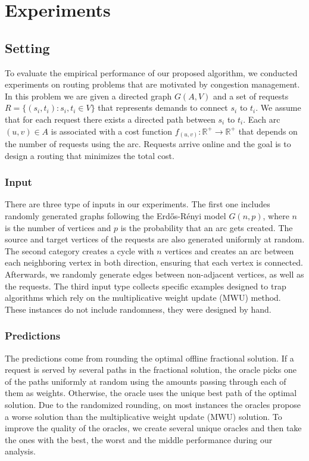 
\section{Experiments} \label{sec:exp}

\subsection{Setting}
To evaluate the empirical performance of our proposed algorithm, we conducted experiments on routing problems
that are motivated by congestion management.
In this problem we are given a directed graph $G(A,V)$ and a set of requests $R = \{(s_{i}, t_{i}) : s_{i}, t_{i} \in V\}$ that represents demands to connect $s_{i}$ to $t_{i}$. We assume that for each request there exists a directed path between $s_{i}$ to $t_{i}$.
Each arc $(u, v) \in A$ is associated with a cost function $f_{(u,v)}: \mathbb{R}^{+} \rightarrow \mathbb{R}^{+}$ that depends on the number of requests using the arc.
Requests arrive online and the goal is to design a routing that minimizes the total cost.


\subsubsection{Input}
There are three type of inputs in our experiments. The first one includes randomly generated graphs following the Erd\H{o}s-Rényi model $G(n, p)$, where $n$ is the number of vertices and $p$ is the probability that an arc gets created. The source and target vertices of the requests are also generated uniformly at random. The second category creates a cycle with $n$ vertices and creates an arc between each neighboring vertex in both direction, ensuring that each vertex is connected. Afterwards, we randomly generate edges between non-adjacent vertices, as well as the requests.
The third input type collects specific examples designed to trap algorithms which rely on the multiplicative weight update (MWU) method. These instances do not include randomness, they were designed by hand.


\subsubsection{Predictions}
The predictions come from rounding the optimal offline fractional solution. If a request is served by several paths in the fractional solution, the oracle picks one of the paths uniformly at random using the amounts passing through each of them as weights. Otherwise, the oracle uses the unique best path of the optimal solution. Due to the randomized rounding, on most instances the oracles propose a worse solution than the multiplicative weight update (MWU) solution. To improve the quality of the oracles, we create several unique oracles and then take the ones with the best, the worst and the middle performance during our analysis.


